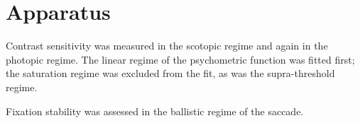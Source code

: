 \section{Apparatus}

Contrast sensitivity was measured in the scotopic regime and again in the
photopic regime. The linear regime of the psychometric function was fitted
first; the saturation regime was excluded from the fit, as was the
supra-threshold regime.

Fixation stability was assessed in the ballistic regime of the saccade.
